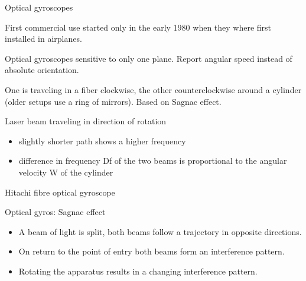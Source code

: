 \documentclass[compress]{beamer}
\begin{document}
\begin{frame}{Optical gyroscopes}

First commercial use started only in the early 1980 when they where
first installed in airplanes.

Optical gyroscopes sensitive to only one plane. Report angular speed
instead of absolute orientation.

One is traveling in a fiber clockwise, the other counterclockwise around
a cylinder (older setups use a ring of mirrors). Based on Sagnac effect.

Laser beam traveling in direction of rotation

\begin{itemize}

\item
  slightly shorter path \rightarrow shows a higher frequency
\item
  difference in frequency Df of the two beams is proportional to the
  angular velocity W of the cylinder
\end{itemize}

Hitachi fibre optical gyroscope

\end{frame}

\begin{frame}{Optical gyros: Sagnac effect}

\begin{itemize}

\item
  A beam of light is split, both beams follow a trajectory in opposite
  directions.
\item
  On return to the point of entry both beams form an interference
  pattern.
\item
  Rotating the apparatus results in a changing interference pattern.
\end{itemize}

\end{frame}
\end{document}
